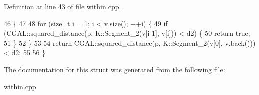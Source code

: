 Definition at line 43 of file within.\-cpp.


\begin{DoxyCode}
46         \{
47 
48             \textcolor{keywordflow}{for} (\textcolor{keywordtype}{size\_t} i = 1; i < v.size(); ++i) \{
49                 \textcolor{keywordflow}{if} (CGAL::squared\_distance(p, K::Segment\_2(v[i-1], v[i])) < d2) \{
50                     \textcolor{keywordflow}{return} \textcolor{keyword}{true};
51                 \}
52             \}
53 
54             \textcolor{keywordflow}{return} CGAL::squared\_distance(p, K::Segment\_2(v[0], v.back())) < d2;
55 
56         \}
\end{DoxyCode}


The documentation for this struct was generated from the following file\-:\begin{DoxyCompactItemize}
\item 
within.\-cpp\end{DoxyCompactItemize}
